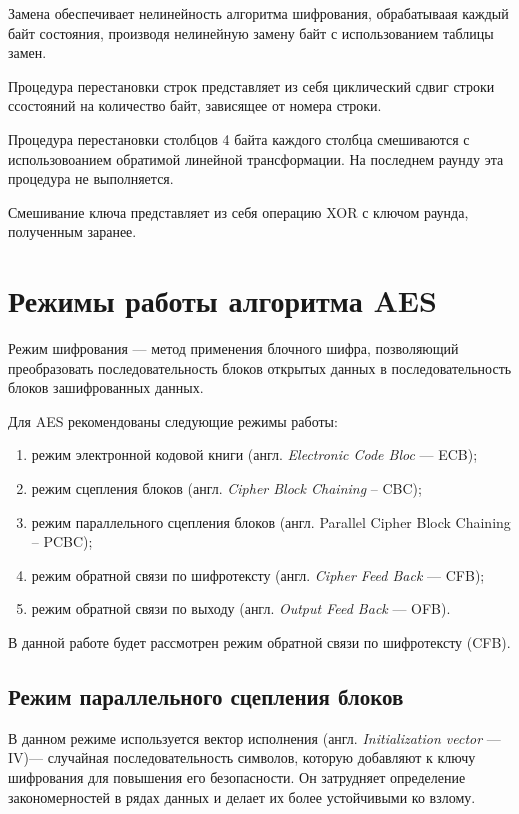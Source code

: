 Замена обеспечивает нелинейность алгоритма шифрования, обрабатываая каждый байт состояния, производя нелинейную замену байт с использованием таблицы замен.

Процедура перестановки строк представляет из себя циклический сдвиг строки ссостояний на количество байт, зависящее от номера строки.

Процедура перестановки столбцов 4 байта каждого столбца смешиваются с использовоанием обратимой линейной трансформации. На последнем раунду эта процедура не выполняется.

Смешивание ключа представляет из себя операцию XOR с ключом раунда, полученным заранее.


\section{Режимы работы алгоритма AES}

Режим шифрования --- метод применения блочного шифра, позволяющий преобразовать последовательность блоков открытых данных в последовательность блоков зашифрованных данных.

Для AES рекомендованы следующие режимы работы:
\begin{enumerate}[label=\arabic*)]
	\item режим электронной кодовой книги (англ. \textit{Electronic Code Bloc} --- ECB);
    \item режим сцепления блоков (англ. \textit{Cipher Block Chaining} -- CBC);
	\item режим параллельного сцепления блоков (англ. Parallel Cipher Block Chaining -- PCBC);
	\item режим обратной связи по шифротексту (англ. \textit{Cipher Feed Back} --- CFB);
	\item режим обратной связи по выходу (англ. \textit{Output Feed Back} --- OFB).
\end{enumerate}

В данной работе будет рассмотрен режим обратной связи по шифротексту (CFB).

\subsection{Режим параллельного сцепления блоков}

В данном режиме используется вектор исполнения (англ. \textit{Initialization vector} --- IV)--- случайная последовательность символов, которую добавляют к ключу шифрования для повышения его безопасности. Он затрудняет определение закономерностей в рядах данных и делает их более устойчивыми ко взлому.

